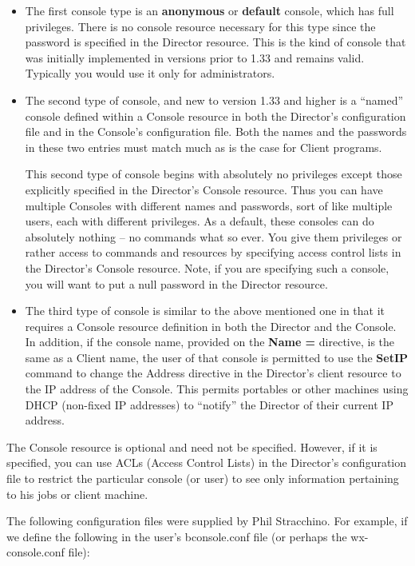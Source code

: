 \begin{itemize}
\item The first console type is an {\bf anonymous} or {\bf default}  console,
   which has full privileges. There is no console  resource necessary for this
   type since the password is  specified in the Director resource. This is the
kind of  console that was initially implemented in versions prior to  1.33 and
remains valid. Typically you would use it only  for administrators.  
\item The second type of console, and new to version 1.33 and  higher is a
   ``named'' console defined within a  Console resource in both the Director's
   configuration file  and in the Console's configuration file. Both the names 
and the passwords in these two entries must match much as  is the case for
Client programs. 

This second type of  console begins with absolutely no privileges except those
explicitly specified in the Director's Console resource.  Thus you can have
multiple Consoles with different names  and passwords, sort of like multiple
users, each with  different privileges. As a default, these consoles can do 
absolutely nothing -- no commands what so ever. You give  them privileges or
rather access to commands and resources  by specifying access control lists in
the Director's  Console resource. Note, if you are specifying such a  console,
you will want to put a null password in the  Director resource.  
\item The third type of console is similar to the above mentioned  one in that
   it requires a Console resource definition in  both the Director and the
   Console. In addition, if the  console name, provided on the {\bf Name =}
directive, is  the same as a Client name, the user of that console is 
permitted to use the {\bf SetIP} command to change the  Address directive in
the Director's client resource to the  IP address of the Console. This permits
portables or other  machines using DHCP (non-fixed IP addresses) to 
``notify'' the Director of their current IP  address. 
\end{itemize}

The Console resource is optional and need not be specified. However, if it is
specified, you can use ACLs (Access Control Lists) in the Director's
configuration file to restrict the particular console (or user) to see only
information pertaining to his jobs or client machine. 

The following configuration files were supplied by Phil Stracchino. For
example, if we define the following in the user's bconsole.conf file (or
perhaps the wx-console.conf file): 

